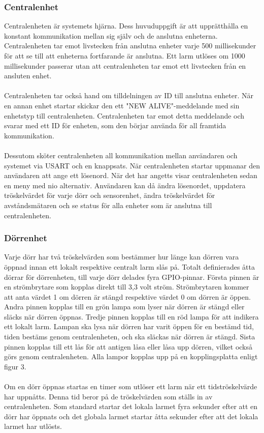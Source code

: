 \documentclass{article}
\begin{document}
\subsubsection{Centralenhet}
Centralenheten är systemets hjärna. Dess huvuduppgift är att upprätthålla en konstant kommunikation mellan sig själv och de anslutna enheterna. Centralenheten tar emot livstecken från anslutna enheter varje 500 millisekunder för att se till att enheterna fortfarande är anslutna. Ett larm utlöses om 1000 millisekunder passerar utan att centralenheten tar emot ett livstecken från en ansluten enhet.
\\
\\
Centralenheten tar också hand om tilldelningen av ID till anslutna enheter. När en annan enhet startar skickar den ett "NEW ALIVE"-meddelande med sin enhetstyp till centralenheten. Centralenheten tar emot detta meddelande och svarar med ett ID för enheten, som den börjar använda för all framtida kommunikation.
\\
\\
Dessutom sköter centralenheten all kommunikation mellan användaren och systemet via USART och en knappsats. När centralenheten startar uppmanar den användaren att ange ett lösenord. När det har angetts visar centralenheten sedan en meny med nio alternativ. Användaren kan då ändra lösenordet, uppdatera tröskelvärdet för varje dörr och sensorenhet, ändra tröskelvärdet för avståndsmätaren och se status för alla enheter som är anslutna till centralenheten.

\subsubsection{Dörrenhet}
Varje dörr har två tröskelvärden som bestämmer hur länge kan dörren vara öppnad innan ett lokalt respektive centralt larm slås på. Totalt definierades åtta dörrar för dörrenheten, till varje dörr delades fyra GPIO-pinnar. Första pinnen är en strömbrytare som kopplas direkt till 3,3 volt ström. Strömbrytaren kommer att anta värdet 1 om dörren är stängd respektive värdet 0 om dörren är öppen. Andra pinnen kopplas till en grön lampa som lyser när dörren är stängd eller släcks när dörren öppnas. Tredje pinnen kopplas till en röd lampa för att indikera ett lokalt larm. Lampan ska lysa när dörren har varit öppen för en bestämd tid, tiden bestäms genom centralenheten, och ska släckas när dörren är stängd. Sista pinnen kopplas till ett lås för att antigen låsa eller låsa upp dörren, vilket också görs genom centralenheten. Alla lampor kopplas upp på en kopplingsplatta enligt figur 3.
\\
\\Om en dörr öppnas startas en timer som utlöser ett larm när ett tidströskelvärde har uppnåtts. Denna tid beror på de tröskelvärden som ställs in av centralenheten. Som standard startar det lokala larmet fyra sekunder efter att en dörr har öppnats och det globala larmet startar åtta sekunder efter att det lokala larmet har utlösts. 
\end{document}
